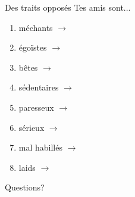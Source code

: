 \documentclass{beamer}
\begin{document}
  \begin{frame}{Des traits opposés}
    Tes amis sont...
    \begin{enumerate}
      \item méchants $\to$ \underline{}
      \item égoïstes $\to$ \underline{}
      \item bêtes $\to$ \underline{}
      \item sédentaires $\to$ \underline{}
      \item paresseux $\to$ \underline{}
      \item sérieux $\to$ \underline{}
      \item mal habillés $\to$ \underline{}
      \item laids $\to$ \underline{}
    \end{enumerate}
  \end{frame}

  \begin{frame}{}
    \begin{center}
      \Large Questions?
    \end{center}
  \end{frame}
\end{document}
